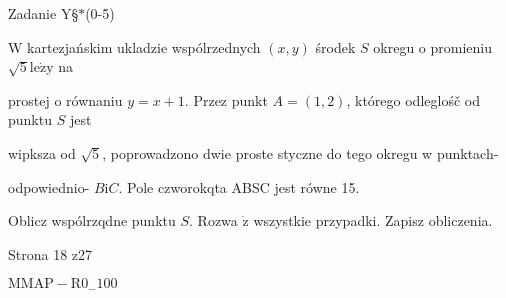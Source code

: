 \documentclass[a4paper,12pt]{article}
\begin{document}
Zadanie Y\S$*$(0-5)

$\mathrm{W}$ kartezjańskim ukladzie wspólrzednych $(x,y)$ środek $S$ okregu o promieniu $\sqrt{5} \mathrm{l}\mathrm{e}\dot{\mathrm{z}}\mathrm{y}$ na

prostej o równaniu $y=x+1$. Przez punkt $A=(1,2)$, którego odleglośč od punktu $S$ jest

wipksza od $\sqrt{5}$, poprowadzono dwie proste styczne do tego okregu w punktach-

odpowiednio- $B \mathrm{i} C$. Pole czworokqta ABSC jest równe 15.

Oblicz wspólrzqdne punktu $S.$ Rozwa $\dot{\mathrm{z}}$ wszystkie przypadki. Zapisz obliczenia.

Strona 18 z27

$\mathrm{M}\mathrm{M}\mathrm{A}\mathrm{P}-\mathrm{R}0_{-}100$
\end{document}
